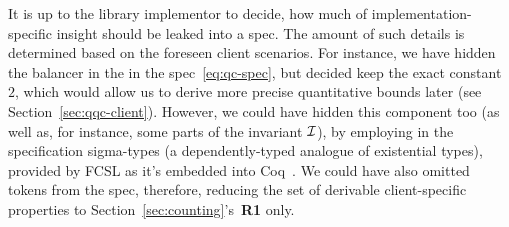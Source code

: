 It is up to the library implementor to decide, how much of
implementation-specific insight should be leaked into a spec. The
amount of such details is determined based on the foreseen client
scenarios. For instance, we have hidden the balancer in the in the
spec~\eqref{eq:qc-spec}, but decided keep the exact constant $2$,
which would allow us to derive more precise quantitative bounds later
(see Section~\ref{sec:qqc-client}). However, we could have hidden this
component too (as well as, for instance, some parts of the invariant
$\mathcal{I}$), by employing in the specification sigma-types (a
dependently-typed analogue of existential types), provided by FCSL as
it's embedded into Coq~\cite{Coq-manual}. We could have also omitted
tokens from the spec, therefore, reducing the set of derivable
client-specific properties to Section~\ref{sec:counting}'s~\textbf{R1}
only.
